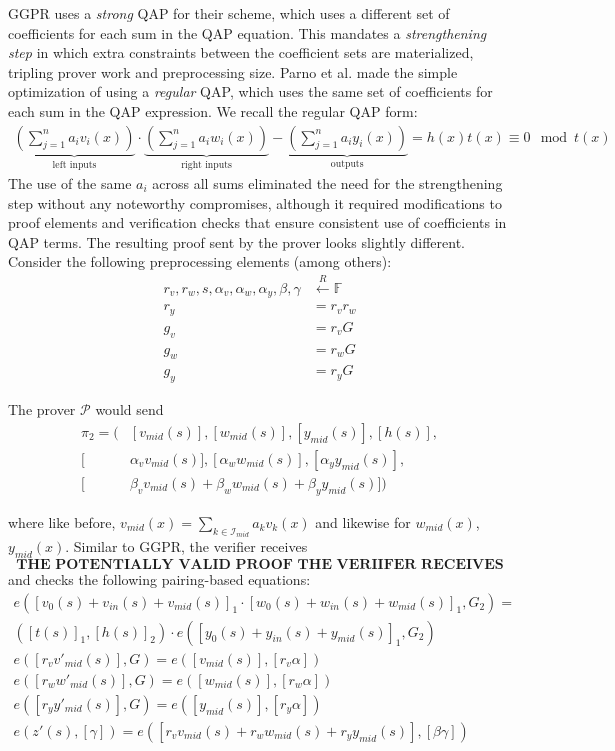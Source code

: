 \noindent GGPR uses a \textit{strong} QAP for their scheme, which uses a different set of coefficients for each sum in the QAP equation. This mandates a \textit{strengthening step} in which extra constraints between the coefficient sets are materialized, tripling prover work and preprocessing size. Parno et al. \cite{pinocchio} made the simple optimization of using a \textit{regular} QAP, which uses the same set of coefficients for each sum in the QAP expression. We recall the regular QAP form:
\begin{align}
\underbrace{\left(\sum_{j=1}^n a_i v_i(x)\right)}_{\text{left inputs}} \cdot \underbrace{\left(\sum_{j=1}^n a_i w_i(x)\right)}_{\text{right inputs}} - \underbrace{\left(\sum_{j=1}^n a_i y_i(x)\right)}_{\text{outputs}} = h(x) t(x) \equiv 0 \mod t(x)
\end{align}
\noindent The use of the same $a_i$ across all sums eliminated the need for the strengthening step without any noteworthy compromises, although it required modifications to proof elements and verification checks that ensure consistent use of coefficients in QAP terms. The resulting proof sent by the prover looks slightly different. Consider the following preprocessing elements (among others):
\begin{align}
r_v, r_w, s, \alpha_v, \alpha_w, \alpha_y, \beta, \gamma &\overset{R}\leftarrow \mathbb{F} \\
r_y &= r_v r_w \\
g_v &= r_v G \\
g_w &= r_w G \\
g_y &= r_y G
\end{align}

\noindent The prover $\mathcal{P}$ would send 
\begin{align}
    \pi_2 = \Big(&[v_{mid}(s)], [w_{mid}(s)], [y_{mid}(s)], [h(s)], \\
    [&\alpha_v v_{mid}(s)], [\alpha_w w_{mid}(s)], [\alpha_y y_{mid}(s)], \\
    [&\beta_v v_{mid}(s) + \beta_w w_{mid}(s) + \beta_y y_{mid}(s)]\Big)
\end{align}

\noindent where like before, $v_{mid}(x) = \sum_{k \in \mathcal{I}_{mid}} a_k v_k(x)$ and likewise for $w_{mid}(x)$, $y_{mid}(x)$. Similar to GGPR, the verifier receives
$$
\textbf{THE POTENTIALLY VALID PROOF THE VERIIFER RECEIVES}
$$
and checks the following pairing-based equations:
\begin{align}
e([v_0(s) + v_{in}(s) + v_{mid}(s)]_1 \cdot [w_0(s) + w_{in}(s) + w_{mid}(s)]_1, G_2) = \\
([t(s)]_1, [h(s)]_2) \cdot e([y_0(s) + y_{in}(s) + y_{mid}(s)]_1, G_2) \\
e([r_v v'_{mid}(s)], G) = e([v_{mid}(s)], [r_v \alpha]) \\
e([r_w w'_{mid}(s)], G) = e([w_{mid}(s)], [r_w \alpha]) \\
e([r_y y'_{mid}(s)], G) = e([y_{mid}(s)], [r_y \alpha]) \\
e(z'(s), [\gamma]) = e([r_v v_{mid}(s) + r_w w_{mid}(s) + r_y y_{mid}(s)], [\beta \gamma])
\end{align}

